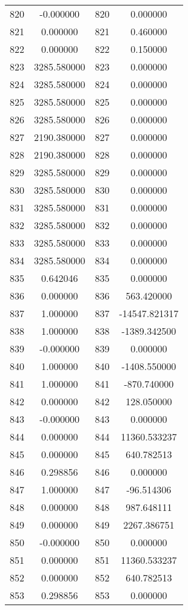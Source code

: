 \documentclass[12pt]{article}
\begin{document}
\begin{longtable}{@{}cccc@{}}
820 & -0.000000 & 820 & 0.000000 \\
821 & 0.000000 & 821 & 0.460000 \\
822 & 0.000000 & 822 & 0.150000 \\
823 & 3285.580000 & 823 & 0.000000 \\
824 & 3285.580000 & 824 & 0.000000 \\
825 & 3285.580000 & 825 & 0.000000 \\
826 & 3285.580000 & 826 & 0.000000 \\
827 & 2190.380000 & 827 & 0.000000 \\
828 & 2190.380000 & 828 & 0.000000 \\
829 & 3285.580000 & 829 & 0.000000 \\
830 & 3285.580000 & 830 & 0.000000 \\
831 & 3285.580000 & 831 & 0.000000 \\
832 & 3285.580000 & 832 & 0.000000 \\
833 & 3285.580000 & 833 & 0.000000 \\
834 & 3285.580000 & 834 & 0.000000 \\
835 & 0.642046 & 835 & 0.000000 \\
836 & 0.000000 & 836 & 563.420000 \\
837 & 1.000000 & 837 & -14547.821317 \\
838 & 1.000000 & 838 & -1389.342500 \\
839 & -0.000000 & 839 & 0.000000 \\
840 & 1.000000 & 840 & -1408.550000 \\
841 & 1.000000 & 841 & -870.740000 \\
842 & 0.000000 & 842 & 128.050000 \\
843 & -0.000000 & 843 & 0.000000 \\
844 & 0.000000 & 844 & 11360.533237 \\
845 & 0.000000 & 845 & 640.782513 \\
846 & 0.298856 & 846 & 0.000000 \\
847 & 1.000000 & 847 & -96.514306 \\
848 & 0.000000 & 848 & 987.648111 \\
849 & 0.000000 & 849 & 2267.386751 \\
850 & -0.000000 & 850 & 0.000000 \\
851 & 0.000000 & 851 & 11360.533237 \\
852 & 0.000000 & 852 & 640.782513 \\
853 & 0.298856 & 853 & 0.000000 \\

\end{longtable}
\end{document}
